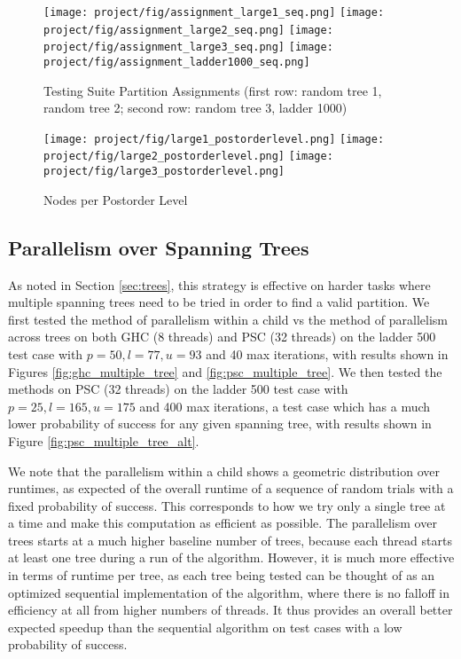 \documentclass[11pt]{article}
\begin{document}
\begin{figure}
    \centering
    \texttt{[image: project/fig/assignment\_large1\_seq.png]}
    \texttt{[image: project/fig/assignment\_large2\_seq.png]}
    \texttt{[image: project/fig/assignment\_large3\_seq.png]}
    \texttt{[image: project/fig/assignment\_ladder1000\_seq.png]}
    \caption{Testing Suite Partition Assignments (first row: random tree 1, random tree 2; second row: random tree 3, ladder 1000)}
    \label{fig:assignment}
\end{figure}

\begin{figure}
    \centering
    \texttt{[image: project/fig/large1\_postorderlevel.png]}
    \texttt{[image: project/fig/large2\_postorderlevel.png]}
    \texttt{[image: project/fig/large3\_postorderlevel.png]}
    \caption{Nodes per Postorder Level}
    \label{fig:nodes_per_level}
\end{figure}

\subsection{Parallelism over Spanning Trees}

As noted in Section \ref{sec:trees}, this strategy is effective on harder tasks where multiple spanning trees need to be tried in order to find a valid partition.
We first tested the method of parallelism within a child vs the method of parallelism across trees on both GHC (8 threads) and PSC (32 threads) on the ladder 500 test case with $p = 50, l=77, u=93$ and 40 max iterations, with results shown in Figures \ref{fig:ghc_multiple_tree} and \ref{fig:psc_multiple_tree}.
We then tested the methods on PSC (32 threads) on the ladder 500 test case with $p = 25, l = 165, u = 175$ and 400 max iterations, a test case which has a much lower probability of success for any given spanning tree, with results shown in Figure \ref{fig:psc_multiple_tree_alt}.

We note that the parallelism within a child shows a geometric distribution over runtimes, as expected of the overall runtime of a sequence of random trials with a fixed probability of success.
This corresponds to how we try only a single tree at a time and make this computation as efficient as possible.
The parallelism over trees starts at a much higher baseline number of trees, because each thread starts at least one tree during a run of the algorithm.
However, it is much more effective in terms of runtime per tree, as each tree being tested can be thought of as an optimized sequential implementation of the algorithm, where there is no falloff in efficiency at all from higher numbers of threads.
It thus provides an overall better expected speedup than the sequential algorithm on test cases with a low probability of success.
\end{document}
